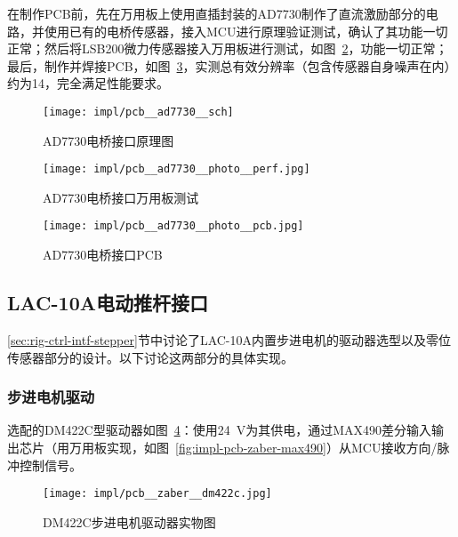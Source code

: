 在制作PCB前，先在万用板上使用直插封装的AD7730制作了直流激励部分的电路，并使用已有的电桥传感器，接入MCU进行原理验证测试，确认了其功能一切正常；然后将LSB200微力传感器接入万用板进行测试，如图~\ref{fig:impl-pcb-ad7730-photo-perf}，功能一切正常；最后，制作并焊接PCB，如图~\ref{fig:impl-pcb-ad7730-photo-pcb}，实测总有效分辨率（包含传感器自身噪声在内）约为\SI{14}{\bit}，完全满足性能要求。

\begin{figure}[tbhp]
\centering
\texttt{[image: impl/pcb\_\_ad7730\_\_sch]}
\caption{AD7730电桥接口\csep 原理图}
\label{fig:impl-pcb-ad7730-sch}
\end{figure}

\begin{figure}[tbhp]
\centering
\texttt{[image: impl/pcb\_\_ad7730\_\_photo\_\_perf.jpg]}
\caption{AD7730电桥接口\csep 万用板测试}
\label{fig:impl-pcb-ad7730-photo-perf}
\end{figure}

\begin{figure}[tbhp]
\centering
\texttt{[image: impl/pcb\_\_ad7730\_\_photo\_\_pcb.jpg]}
\caption{AD7730电桥接口\csep PCB}
\label{fig:impl-pcb-ad7730-photo-pcb}
\end{figure}


\clearpage


\subsection{LAC-10A电动推杆接口}\label{sec:impl-pcb-zaber}

\ref{sec:rig-ctrl-intf-stepper}节中讨论了LAC-10A内置步进电机的驱动器选型以及零位传感器部分的设计。以下讨论这两部分的具体实现。

\subsubsection{步进电机驱动}\label{sec:impl-pcb-zaber-stepper}

选配的DM422C型驱动器如图~\ref{fig:impl-pcb-zaber-dm422c}：使用\SI{+24}{\V}为其供电，通过MAX490差分输入输出芯片（用万用板实现，如图~\ref{fig:impl-pcb-zaber-max490}）从MCU接收方向/脉冲控制信号。

\begin{figure}[tbh]
\centering
\texttt{[image: impl/pcb\_\_zaber\_\_dm422c.jpg]}
\caption{DM422C步进电机驱动器实物图}
\label{fig:impl-pcb-zaber-dm422c}
\end{figure}

